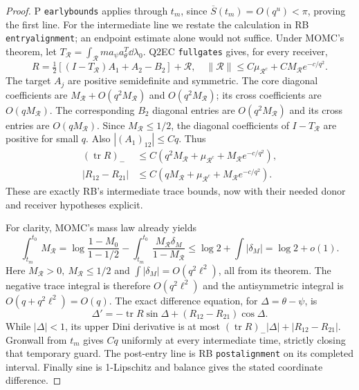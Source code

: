 \documentclass[11pt]{article}
\numberwithin{equation}{section}
\theoremstyle{remark}\newtheorem{remark}[theorem]{Remark}
\begin{document}
\begin{proof}
P \texttt{earlybounds} applies through \(t_m\), since
\(\overline S(t_m)=O(q^u)<\pi\), proving the first line.
For the intermediate line we restate the calculation in
RB \texttt{entryalignment}; an endpoint estimate alone would
not suffice.
Under MOMC's theorem, let
\(T_{\mathcal R}=\int_{\mathcal R}m a_\psi a_\theta^T\dd\lambda_0\).
Q2EC \texttt{fullgates} gives, for every receiver,
\[
 R=\tfrac12[(I-T_{\mathcal R})A_1+A_2-B_2]+\mathcal R,\quad
 \|\mathcal R\|\le C\mu_{\mathcal R^c}
                         +CM_{\mathcal R}e^{-c/q^2}.
 \]
The target \(A_j\) are positive semidefinite and symmetric.
The core diagonal coefficients are \(M_{\mathcal R}+O(q^2M_{\mathcal R})\)
and \(O(q^2M_{\mathcal R})\); its cross coefficients are
\(O(qM_{\mathcal R})\). The corresponding \(B_2\) diagonal
entries are \(O(q^2M_{\mathcal R})\) and its cross entries
are \(O(qM_{\mathcal R})\).
Since \(M_{\mathcal R}\le1/2\), the diagonal coefficients
of \(I-T_{\mathcal R}\) are positive for small \(q\).
Also \(|(A_1)_{12}|\le Cq\). Thus
\begin{align*}
 (\operatorname{tr}R)_-
 &\le C(q^2M_{\mathcal R}+\mu_{\mathcal R^c}
                             +M_{\mathcal R}e^{-c/q^2}),\\
 |R_{12}-R_{21}|
 &\le C(qM_{\mathcal R}+\mu_{\mathcal R^c}
                             +M_{\mathcal R}e^{-c/q^2}).
\end{align*}
These are exactly RB's intermediate trace bounds, now with
their needed donor and receiver hypotheses explicit.

For clarity, MOMC's mass law already yields
\[
 \int_{t_m}^{t_0}M_{\mathcal R}
 =\log\frac{1-M_0}{1-1/2}
   -\int_{t_m}^{t_0}
       \frac{M_{\mathcal R}\delta_M}{1-M_{\mathcal R}}
 \le\log2+\int|\delta_M|=\log2+o(1).
 \]
Here \(M_{\mathcal R}>0,\ M_{\mathcal R}\le1/2\) and
\(\int|\delta_M|=O(q^2\ell^2)\), all from its theorem.
The negative trace integral is therefore \(O(q^2\ell^2)\)
and the antisymmetric integral is \(O(q+q^2\ell^2)=O(q)\).
The exact difference equation, for \(\Delta=\theta-\psi\), is
\[
 \Delta'=-\operatorname{tr}R\sin\Delta
                         +(R_{12}-R_{21})\cos\Delta.
 \]
While \(|\Delta|<1\), its upper Dini derivative is at most
\((\operatorname{tr}R)_-|\Delta|+|R_{12}-R_{21}|\).
Gronwall from \(t_m\) gives \(Cq\) uniformly at every
intermediate time, strictly closing that temporary guard.
The post-entry line is RB \texttt{postalignment} on its
completed interval. Finally sine is 1-Lipschitz and balance
gives the stated coordinate difference.
\end{proof}
\end{document}
